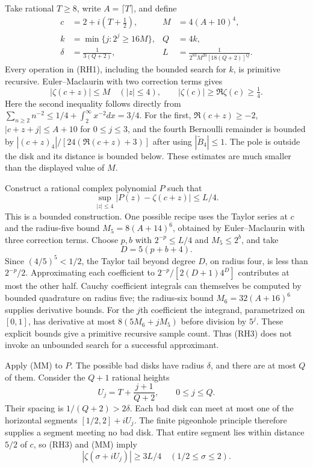 Take rational $T\ge8$, write $A=\lceil T\rceil$, and define
\[
 \begin{aligned}
 c&=2+i(T+\tfrac12),& M&=4(A+10)^4,\\
 k&=\min\{j:2^j\ge16M\},& Q&=4k,\\
 \delta&=\frac1{3(Q+2)},&
 L&=\frac1{2^{83}M^{20}[18(Q+2)]^Q}.
 \end{aligned}                                             \tag{RH1}
\]
Every operation in (RH1), including the bounded search for $k$, is primitive
recursive.  Euler--Maclaurin with two correction terms gives
\[
 |\zeta(c+z)|\le M\quad(|z|\le4),\qquad
 |\zeta(c)|\ge\Re\zeta(c)\ge\tfrac14.                    \tag{RH2}
\]
Here the second inequality follows directly from
$\sum_{n\ge2}n^{-2}\le1/4+\int_2^\infty x^{-2}dx=3/4$.
For the first, $\Re(c+z)\ge-2$, $|c+z+j|\le A+10$ for $0\le j\le3$,
and the fourth Bernoulli remainder is bounded by
$|(c+z)_4|/[24(\Re(c+z)+3)]$ after using $|\widetilde B_4|\le1$.
The pole is outside the disk and its distance is bounded below.
These estimates are much smaller than the displayed value of $M$.

Construct a rational complex polynomial $P$ such that
\[
 \sup_{|z|\le4}|P(z)-\zeta(c+z)|\le L/4.                 \tag{RH3}
\]
This is a bounded construction.  One possible recipe uses the Taylor series
at $c$ and the radius-five bound $M_5=8(A+14)^6$, obtained by
Euler--Maclaurin with three correction terms.  Choose $p,b$ with
$2^{-p}\le L/4$ and $M_5\le2^b$, and take
\[
 D=5(p+b+4).
\]
Since $(4/5)^5<1/2$, the Taylor tail beyond degree $D$, on radius four,
is less than $2^{-p}/2$.  Approximating each coefficient to
$2^{-p}/[2(D+1)4^D]$ contributes at most the other half.
Cauchy coefficient integrals can themselves be computed by bounded
quadrature on radius five; the radius-six bound
$M_6=32(A+16)^6$ supplies derivative bounds.  For the $j$th coefficient the
integrand, parametrized on $[0,1]$, has derivative at most
$8(5M_6+jM_5)$ before division by $5^j$.  These explicit bounds give a
primitive recursive sample count.  Thus (RH3) does not invoke an unbounded
search for a successful approximant.

Apply (MM) to $P$.  The possible bad disks have radius $\delta$, and there
are at most $Q$ of them.  Consider the $Q+1$ rational heights
\[
 U_j=T+\frac{j+1}{Q+2},\qquad 0\le j\le Q.              \tag{RH4}
\]
Their spacing is $1/(Q+2)>2\delta$.  Each bad disk can meet at most one of
the horizontal segments $[1/2,2]+iU_j$.  The finite pigeonhole principle
therefore supplies a segment meeting no bad disk.  That entire segment lies
within distance $5/2$ of $c$, so (RH3) and (MM) imply
\[
 |\zeta(\sigma+iU_j)|\ge3L/4\quad(1/2\le\sigma\le2).
                                                               \tag{RH5}
\]


